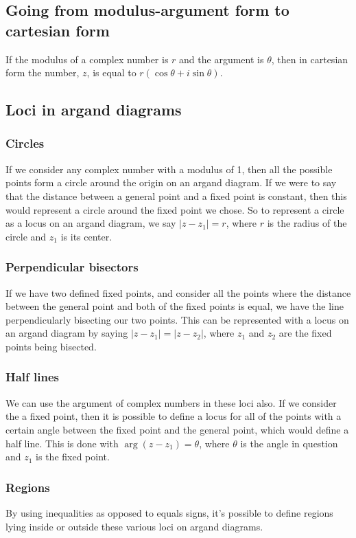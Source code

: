 \subsection{Going from modulus-argument form to cartesian form}
If the modulus of a complex number is $r$ and the argument is $\theta$, then in cartesian form the number, $z$, is equal to $r(\cos \theta + i \sin \theta)$.

\subsection{Loci in argand diagrams}

\subsubsection{Circles}
If we consider any complex number with a modulus of 1, then all the possible points form a circle around the origin on an argand diagram. If we were to say that the distance between a general point and a fixed point is constant, then this would represent a circle around the fixed point we chose. So to represent a circle as a locus on an argand diagram, we say $|z-z_1|=r$, where $r$ is the radius of the circle and $z_1$ is its center.

\subsubsection{Perpendicular bisectors}
If we have two defined fixed points, and consider all the points where the distance between the general point and both of the fixed points is equal, we have the line perpendicularly bisecting our two points. This can be represented with a locus on an argand diagram by saying $|z-z_1|=|z-z_2|$, where $z_1$ and $z_2$ are the fixed points being bisected.

\subsubsection{Half lines}
We can use the argument of complex numbers in these loci also. If we consider the a fixed point, then it is possible to define a locus for all of the points with a certain angle between the fixed point and the general point, which would define a half line. This is done with $\arg(z-z_1)=\theta$, where $\theta$ is the angle in question and $z_1$ is the fixed point.

\subsubsection{Regions}
By using inequalities as opposed to equals signs, it's possible to define regions lying inside or outside these various loci on argand diagrams.

